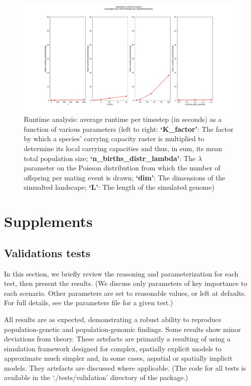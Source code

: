 ﻿\documentclass{article}
\begin{document}
\begin{figure}[H]
        \includegraphics[width=175mm]{./img/final/runtime.pdf}
        \caption{Runtime analysis: average runtime per timestep (in seconds)
                 as a function of various parameters
                 (left to right: \textbf{`K\_factor'}:
                 The factor by which a species' carrying capacity
                 raster is multiplied to determine its local carrying capacities
                 and thus, in sum, its mean total population size;
                 \textbf{`n\_births\_distr\_lambda'}:
                 The $\lambda$ parameter on the Poisson distribution from which
                 the number of offspring per mating event is drawn;
                 \textbf{`dim'}: The dimensions of the simualted landscape;
                 \textbf{`L'}: The length of the simulated genome)}
        \label{fig:runtime}
\end{figure}



\pagebreak
\section{Supplements}

\subsection{Validations tests}
In this section, we briefly review the reasoning and parameterization for each test,
then present the results.
(We discuss only parameters of key importance to each scenario.
Other parameters are set to reasonable values, or left at defaults.
For full details, see the parameters file for a given test.)

All results are as expected, demonstrating a robust ability to reproduce 
population-genetic and population-genomic findings.
Some results show minor deviations from theory.
These artefacts are primarily a resulting of using a simulation framework
designed for complex, spatially explicit models 
to approximate much simpler and, in some cases, aspatial or spatially implicit models.
They artefacts are discussed where applicable.
(The code for all tests is available in the `./tests/validation' directory of the package.)
\end{document}
